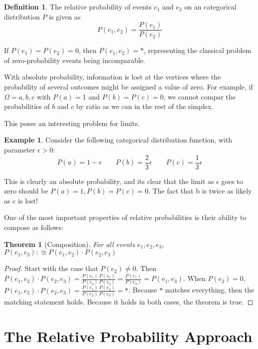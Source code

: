 \documentclass[twoside]{article}
\theoremstyle{plain}%
\newtheorem{theorem}{Theorem}[section]
\theoremstyle{definition}
\newtheorem{definition}{Definition}[section]
\newtheorem{example}{Example}[section]
\theoremstyle{remark}
\begin{document}
\begin{definition}
\label{def:ratio}
The relative probability of events \(e_1\) and \(e_2\) on an categorical distribution \(P\) is given as
\[P(e_1, e_2) = \frac{P(e_1)}{P(e_2)}\]
\end{definition}

If \(P(e_1) = P(e_2) = 0\), then \(P(e_1, e_2) = \ast\), representing the classical problem of zero-probability events being incomparable.

With absolute probability, information is lost at the vertices where the probability of several outcomes might be assigned a value of zero. For example, if \(\Omega = {a, b, c}\) with \(P(a) = 1\) and \(P(b) = P(c) = 0\), we cannot compar the probabilities of \(b\) and \(c\) by ratio as we can in the rest of the simplex.

This poses an interesting problem for limits.

\begin{example}
\label{ex:abs_lose_info}
Consider the following categorical distribution function, with parameter \(\epsilon > 0\):
\[
P(a) = 1 - \epsilon\qquad
P(b) = \frac{2}{3}\epsilon\qquad
P(c) = \frac{1}{3}\epsilon
\]
\end{example}

This is clearly an absolute probability, and its clear that the limit as \(\epsilon\) goes to zero should be \(P(a) = 1, P(b) = P(c) = 0\). The fact that b is twice as likely as c is lost!

One of the most important properties of relative probabilities is their ability to compose as follows:

\begin{theorem}[Composition]
\label{thm:abs_composition}
For all events \(e_1, e_2, e_3\), \(P(e_1, e_3) :\cong P(e_1, e_2) \cdot P(e_2, e_3)\)
\end{theorem}

\begin{proof}
Start with the case that \(P(e_2)\neq 0\). Then \(P(e_1, e_2) \cdot P(e_2, e_3) = \frac{P(e_1)}{P(e_2)}\frac{P(e_2)}{P(e_3)} = \frac{P(e_1)}{P(e_3)} = P(e_1, e_3)\). When \(P(e_2) = 0\), \(P(e_1, e_2) \cdot P(e_2, e_3) = \frac{P(e_1)}{P(e_2)}\frac{P(e_2)}{P(e_3)} = \ast\). Because \(\ast\) matches everything, then the matching statement holds. Because it holds in both cases, the theorem is true.
\end{proof}

\section{The Relative Probability Approach}
\label{section:new_relative_prob}
\end{document}
